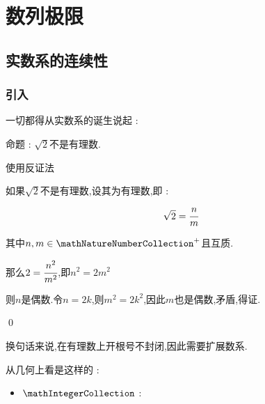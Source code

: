 {\section{数列极限}{

\subsection{实数系的连续性}{

\subsubsection{引入}{
    一切都得从实数系的诞生说起 :

    命题 : $\sqrt{2}$不是有理数.

    \begin{center}
    \end{center}

    使用反证法

    如果$\sqrt{2}$不是有理数,设其为有理数,即 : $$
        \sqrt{2} = \cfrac{n}{m}
    $$

    其中$n,m \in \mathNatureNumberCollection^+$且互质.

    那么$2 = \cfrac{n^2}{m^2}$,即$n^2 = 2m^2$

    则$n$是偶数.令$n = 2k$,则$m^2 = 2k^2$,因此$m$也是偶数,矛盾,得证.

    \qed

    换句话来说,在有理数上开根号不封闭,因此需要扩展数系.

    从几何上看是这样的 :

    \begin{center}
    \end{center}

    \begin{itemize}
        \item {
              $\mathIntegerCollection$ :

}
\end{itemize}}}}}
